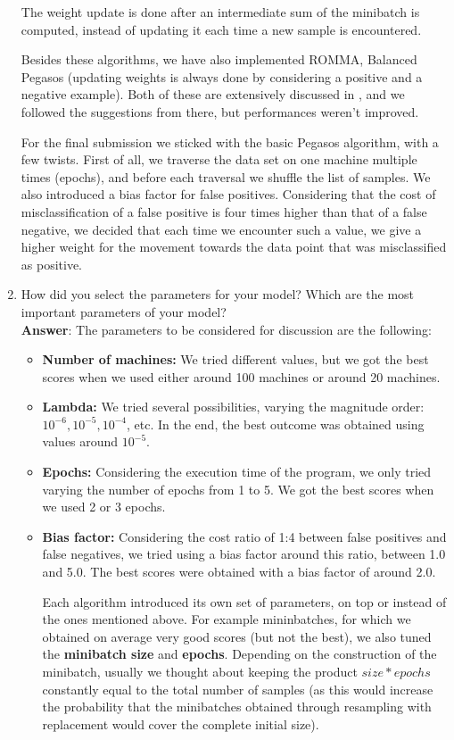 \documentclass[11pt]{article}
\begin{document}
\begin{enumerate}
The weight update is done after an intermediate sum of the minibatch is
computed, instead of updating it each time a new sample is encountered.

Besides these algorithms, we have also implemented ROMMA, Balanced
Pegasos (updating weights is always done by considering a positive and a
negative example). Both of these are extensively discussed in \cite{Sculley09}, 
and we followed the suggestions from there, but performances weren't improved.

For the final submission we sticked with the basic Pegasos algorithm, with a few twists.
First of all, we traverse the data set on one machine multiple times (epochs), 
and before each traversal we shuffle the list of samples. 
We also introduced a bias factor for false positives. Considering that the cost of 
misclassification of a false positive is four times higher than that of a false negative, 
we decided that each time we encounter such a value, we give a higher weight 
for the movement towards the data point that was misclassified as positive.


\item How did you select the parameters for your model? Which are the
  most important parameters of your model? \\
  
\textbf{Answer}:  The parameters to be considered for discussion are the following:
\begin{itemize}
\item{\textbf{Number of machines:}} We tried different values, but we got the best scores 
when we used either around 100 machines or around 20 machines.
\item{\textbf{Lambda:}} We tried several possibilities, varying the
magnitude order: $10^{-6}, 10^{-5}, 10^{-4}$, etc. In the end, the best
outcome was obtained using values around $10^{-5}$.
\item{\textbf{Epochs:}} Considering the execution time of the program, we only tried 
varying the number of epochs from 1 to 5. We got the best scores when we used 2 or 3 
epochs.
\item{\textbf{Bias factor:}} Considering the cost ratio of 1:4 between false positives 
and false negatives, we tried using a bias factor around this ratio, between 1.0 and 5.0.
The best scores were obtained with a bias factor of around 2.0.

Each algorithm introduced its own set of parameters, on top or instead
of the ones mentioned above. For example mininbatches, for which we
obtained on average very good scores (but not the best), we also tuned
the \textbf{minibatch size} and \textbf{epochs}. Depending on the
construction of the minibatch, usually we thought about keeping the
product $ size * epochs $ constantly equal to the total number of
samples (as this would increase the probability that the minibatches
obtained through resampling with replacement would cover the complete
initial size).


\end{itemize}
\end{enumerate}
\end{document}
